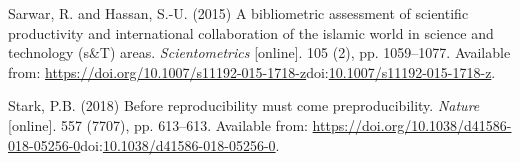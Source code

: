 \documentclass[]{article}
\begin{document}
\leavevmode\hypertarget{ref-Sarwar2015}{}%
Sarwar, R. and Hassan, S.-U. (2015) A bibliometric assessment of
scientific productivity and international collaboration of the islamic
world in science and technology (s\&T) areas. \emph{Scientometrics}
{[}online{]}. 105 (2), pp. 1059--1077. Available from:
\url{https://doi.org/10.1007/s11192-015-1718-z}doi:\href{https://doi.org/10.1007/s11192-015-1718-z}{10.1007/s11192-015-1718-z}.

\leavevmode\hypertarget{ref-Stark2018}{}%
Stark, P.B. (2018) Before reproducibility must come preproducibility.
\emph{Nature} {[}online{]}. 557 (7707), pp. 613--613. Available from:
\url{https://doi.org/10.1038/d41586-018-05256-0}doi:\href{https://doi.org/10.1038/d41586-018-05256-0}{10.1038/d41586-018-05256-0}.
\end{document}
